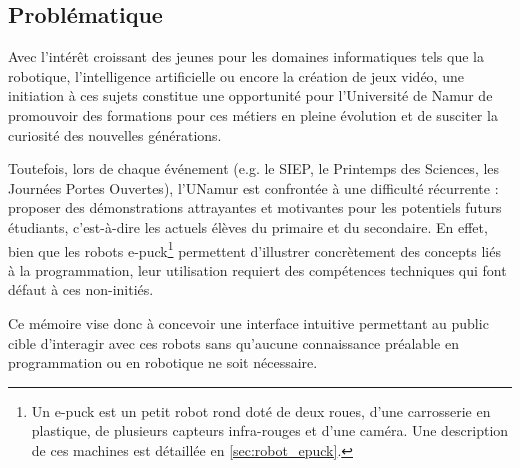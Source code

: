 \subsection{Problématique} \label{sec:problématiques}

Avec l’intérêt croissant des jeunes pour les domaines informatiques tels que la robotique, l’intelligence artificielle ou encore la création de jeux vidéo, une initiation à ces sujets constitue une opportunité pour l’Université de Namur de promouvoir des formations pour ces métiers en pleine évolution et de susciter la curiosité des nouvelles générations.  

Toutefois, lors de chaque événement (e.g. le SIEP, le Printemps des Sciences, les Journées Portes Ouvertes), l’UNamur est confrontée à une difficulté récurrente : proposer des démonstrations attrayantes et motivantes pour les potentiels futurs étudiants, c'est-à-dire les actuels élèves du primaire et du secondaire. 
En effet, bien que les robots e-puck\footnote{Un e-puck est un petit robot rond doté de deux roues, d'une carrosserie en plastique, de plusieurs capteurs infra-rouges et d'une caméra. Une description de ces machines est détaillée en \autoref{sec:robot_epuck}.} permettent d’illustrer concrètement des concepts liés à la programmation, leur utilisation requiert des compétences techniques qui font défaut à ces non-initiés.

Ce mémoire vise donc à concevoir une interface intuitive permettant au public cible d’interagir avec ces robots sans qu'aucune connaissance préalable en programmation ou en robotique ne soit nécessaire.  
